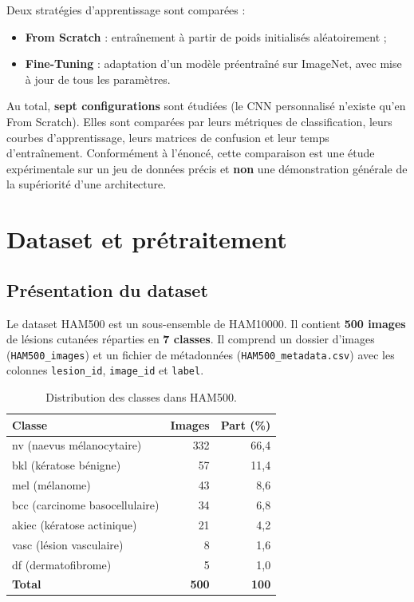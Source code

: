 \documentclass[12pt,a4paper]{article}
\begin{document}
Deux stratégies d'apprentissage sont comparées :
\begin{itemize}[nosep]
  \item \textbf{From Scratch} : entraînement à partir de poids initialisés aléatoirement ;
  \item \textbf{Fine-Tuning} : adaptation d'un modèle préentraîné sur ImageNet, avec mise à jour de tous les paramètres.
\end{itemize}

Au total, \textbf{sept configurations} sont étudiées (le CNN personnalisé n'existe qu'en From Scratch). Elles sont comparées par leurs métriques de classification, leurs courbes d'apprentissage, leurs matrices de confusion et leur temps d'entraînement. Conformément à l'énoncé, cette comparaison est une étude expérimentale sur un jeu de données précis et \textbf{non} une démonstration générale de la supériorité d'une architecture.

\section{Dataset et prétraitement}
\subsection{Présentation du dataset}
Le dataset HAM500 est un sous-ensemble de HAM10000. Il contient \textbf{500 images} de lésions cutanées réparties en \textbf{7 classes}. Il comprend un dossier d'images (\texttt{HAM500\_images}) et un fichier de métadonnées (\texttt{HAM500\_metadata.csv}) avec les colonnes \texttt{lesion\_id}, \texttt{image\_id} et \texttt{label}.

\begin{table}[H]
\centering
\caption{Distribution des classes dans HAM500.}\label{tab:classes}
\begin{tabular}{lrr}
\toprule
\textbf{Classe} & \textbf{Images} & \textbf{Part (\%)} \\
\midrule
nv (naevus mélanocytaire) & 332 & 66,4 \\
bkl (kératose bénigne) & 57 & 11,4 \\
mel (mélanome) & 43 & 8,6 \\
bcc (carcinome basocellulaire) & 34 & 6,8 \\
akiec (kératose actinique) & 21 & 4,2 \\
vasc (lésion vasculaire) & 8 & 1,6 \\
df (dermatofibrome) & 5 & 1,0 \\
\midrule
\textbf{Total} & \textbf{500} & \textbf{100} \\
\bottomrule
\end{tabular}
\end{table}
\end{document}
